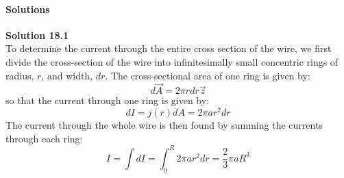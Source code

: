 \paragraph{Solutions}

\begin{framed}
\textbf{Solution 18.1}\\
To determine the current through the entire cross section of the wire, we first divide the cross-section of the wire into infinitesimally small concentric rings of radius, $r$, and width, $dr$. The cross-sectional area of one ring is given by:
\begin{equation}
d\vec A = 2\pi r dr \vec z
\end{equation}
so that the current through one ring is given by:
\begin{equation}
dI = j(r) dA = 2\pi a r^2 dr
\end{equation}
The current through the whole wire is then found by summing the currents through each ring:
\begin{equation}
I=\int dI = \int_0^R 2\pi a r^2 dr=\frac{2}{3}\pi aR^3
\end{equation}
\end{framed}

